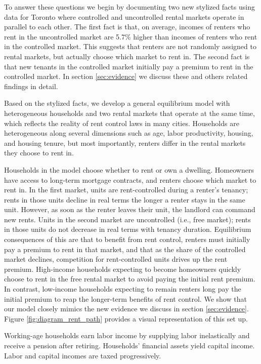 \documentclass[parskip=full]{article}
\begin{document}
To answer these questions we begin by documenting two new stylized facts using data for Toronto where controlled and uncontrolled rental markets operate in parallel to each other. The first fact is that, on average, incomes of renters who rent in the uncontrolled market are 5.7\% higher than incomes of renters who rent in the controlled market. This suggests that renters are not randomly assigned to rental markets, but actually choose which market to rent in. The second fact is that new tenants in the controlled market initially pay a premium to rent in the controlled market. In section \ref{sec:evidence} we discuss these and others related findings in detail. 

Based on the stylized facts, we develop a general equilibrium model with heterogeneous households and two rental markets that operate at the same time, which reflects the reality of rent control laws in many cities. Households are heterogeneous along several dimensions such as age, labor productivity, housing, and housing tenure, but most importantly, renters differ in the rental markets they choose to rent in. 

Households in the model choose whether to rent or own a dwelling. Homeowners have access to long-term mortgage contracts, and renters choose which market to rent in. In the first market, units are rent-controlled during a renter's tenancy; rents in those units decline in real terms the longer a renter stays in the same unit. However, as soon as the renter leaves their unit, the landlord can command new rents. Units in the second market are uncontrolled (i.e., free market); rents in those units do not decrease in real terms with tenancy duration. Equilibrium consequences of this are that to benefit from rent control, renters must initially pay a premium to rent in that market, and that as the share of the controlled market declines, competition for rent-controlled units drives up the rent premium. High-income households expecting to become homeowners quickly choose to rent in the free rental market to avoid paying the initial rent premium. In contrast, low-income households expecting to remain renters long pay the initial premium to reap the longer-term benefits of rent control. We show that our model closely mimics the new evidence we discuss in section \ref{sec:evidence}. Figure \ref{fig:diagram_rent_path} provides a visual representation of this set up.

Working-age households earn labor income by supplying labor inelastically and receive a pension after retiring. Households' financial assets yield capital income. Labor and capital incomes are taxed progressively.
\end{document}
